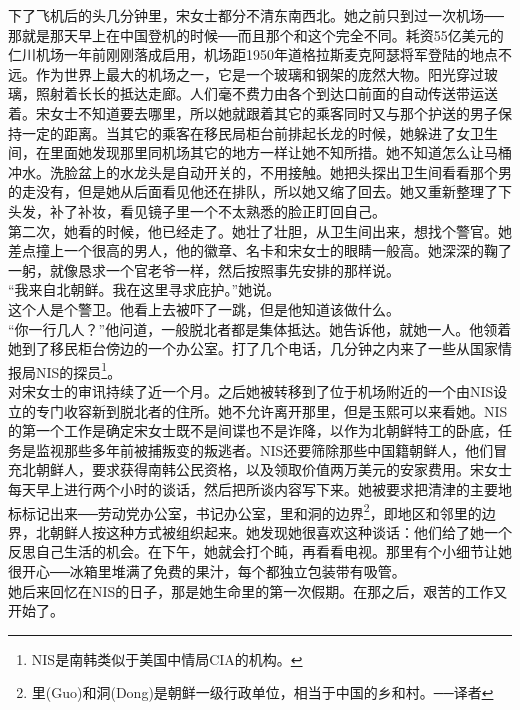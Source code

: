 下了飞机后的头几分钟里，宋女士都分不清东南西北。她之前只到过一次机场──那就是那天早上在中国登机的时候──而且那个和这个完全不同。耗资55亿美元的仁川机场一年前刚刚落成启用，机场距1950年道格拉斯麦克阿瑟将军登陆的地点不远。作为世界上最大的机场之一，它是一个玻璃和钢架的庞然大物。阳光穿过玻璃，照射着长长的抵达走廊。人们毫不费力由各个到达口前面的自动传送带运送着。宋女士不知道要去哪里，所以她就跟着其它的乘客同时又与那个护送的男子保持一定的距离。当其它的乘客在移民局柜台前排起长龙的时候，她躲进了女卫生间，在里面她发现那里同机场其它的地方一样让她不知所措。她不知道怎么让马桶冲水。洗脸盆上的水龙头是自动开关的，不用接触。她把头探出卫生间看看那个男的走没有，但是她从后面看见他还在排队，所以她又缩了回去。她又重新整理了下头发，补了补妆，看见镜子里一个不太熟悉的脸正盯回自己。\\

第二次，她看的时候，他已经走了。她壮了壮胆，从卫生间出来，想找个警官。她差点撞上一个很高的男人，他的徽章、名卡和宋女士的眼睛一般高。她深深的鞠了一躬，就像恳求一个官老爷一样，然后按照事先安排的那样说。\\

“我来自北朝鲜。我在这里寻求庇护。”她说。\\

这个人是个警卫。他看上去被吓了一跳，但是他知道该做什么。\\

“你一行几人？”他问道，一般脱北者都是集体抵达。她告诉他，就她一人。他领着她到了移民柜台傍边的一个办公室。打了几个电话，几分钟之内来了一些从国家情报局NIS的探员\footnote{NIS是南韩类似于美国中情局CIA的机构。}。\\

对宋女士的审讯持续了近一个月。之后她被转移到了位于机场附近的一个由NIS设立的专门收容新到脱北者的住所。她不允许离开那里，但是玉熙可以来看她。NIS的第一个工作是确定宋女士既不是间谍也不是诈降，以作为北朝鲜特工的卧底，任务是监视那些多年前被捕叛变的叛逃者。NIS还要筛除那些中国籍朝鲜人，他们冒充北朝鲜人，要求获得南韩公民资格，以及领取价值两万美元的安家费用。宋女士每天早上进行两个小时的谈话，然后把所谈内容写下来。她被要求把清津的主要地标标记出来──劳动党办公室，书记办公室，里和洞的边界\footnote{里(Guo)和洞(Dong)是朝鲜一级行政单位，相当于中国的乡和村。──译者}，即地区和邻里的边界，北朝鲜人按这种方式被组织起来。她发现她很喜欢这种谈话：他们给了她一个反思自己生活的机会。在下午，她就会打个盹，再看看电视。那里有个小细节让她很开心──冰箱里堆满了免费的果汁，每个都独立包装带有吸管。\\

她后来回忆在NIS的日子，那是她生命里的第一次假期。在那之后，艰苦的工作又开始了。\\

